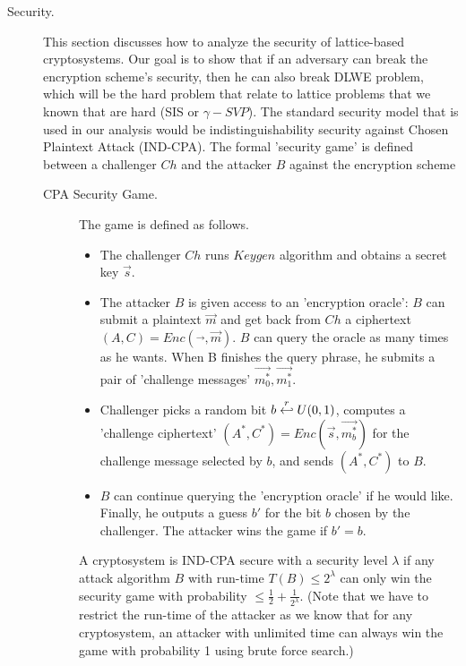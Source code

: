 \begin{description}
\item [Security.] This section discusses how to analyze the security of
  lattice-based cryptosystems. Our goal is to show that if an adversary can
  break the encryption scheme's security, then he can also break DLWE problem,
  which will be the hard problem that relate to lattice problems that we known
  that are hard (SIS or $\gamma-SVP$). The standard security model that is used
  in our analysis would be indistinguishability security against Chosen
  Plaintext Attack (IND-CPA). The formal 'security game' is defined between a
  challenger $Ch$ and the attacker $B$ against the encryption scheme

  \begin{description}
  \item[CPA Security Game.] The game is defined as follows.
    \begin{itemize}
    \item The challenger $Ch$ runs $Keygen$ algorithm and obtains a secret key
      $\vec{s}$.
    \item The attacker $B$ is given access to an 'encryption oracle': $B$ can
      submit a plaintext $\vec{m}$ and get back from $Ch$ a ciphertext
      $(A,C) = Enc(\vec{}, \vec{m})$. $B$ can query the oracle as many times as
      he wants. When B finishes the query phrase, he submits a pair of
      'challenge messages' $\vec{m_0^*},\vec{m_1^*}$.
    \item Challenger picks a random bit $b \stackrel{r}{\hookleftarrow} U(0,1)$, computes a
      'challenge ciphertext' $(A^*, C^*) = Enc(\vec{s}, \vec{m_b^*})$ for the
      challenge message selected by $b$, and sends $(A^*, C^*)$ to $B$.
    \item $B$ can continue querying the 'encryption oracle' if he would
      like. Finally, he outputs a guess $b'$ for the bit $b$ chosen by the
      challenger. The attacker wins the game if $b' = b$.
    \end{itemize}
    \begin{definition}
       A cryptosystem is IND-CPA secure with a security level
      $\lambda$ if any attack algorithm $B$ with run-time $T(B) \leq 2^\lambda$
      can only win the security game with probability
      $\leq \frac{1}{2} + \frac{1}{2^\lambda}$.  (Note that we have to restrict
      the run-time of the attacker as we know that for any cryptosystem, an
      attacker with unlimited time can always win the game with probability 1
      using brute force search.)
      \label{def:IND-CPA Security}
    \end{definition}


\end{description}
\end{description}
